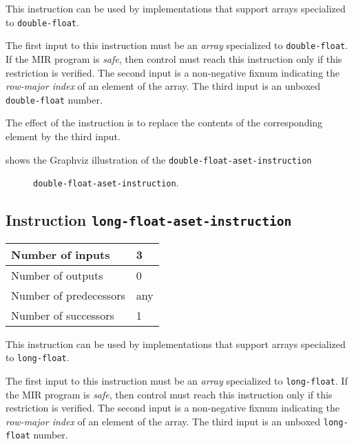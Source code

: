 This instruction can be used by implementations that support arrays
specialized to \texttt{double-float}.

The first input to this instruction must be an \emph{array}
specialized to \texttt{double-float}.  If the MIR program is
\emph{safe}, then control must reach this instruction only if this
restriction is verified.  The second input is a non-negative fixnum
indicating the \emph{row-major index} of an element of the array.  
The third input is an unboxed \texttt{double-float} number.

The effect of the instruction is to replace the contents of the
corresponding element by the third input.

 shows the Graphviz illustration of the
\texttt{double-float-aset-instruction}

\begin{figure}
\begin{center}
\end{center}
\caption{\label{fig-double-float-aset-instruction}
\texttt{double-float-aset-instruction}.}
\end{figure}

\subsection{Instruction \texttt{long-float-aset-instruction}}
\label{mir-instruction-long-float-aset}

\begin{tabular}{|l|l|}
\hline
Number of inputs & 3\\
\hline
Number of outputs & 0\\
\hline
Number of predecessors & any\\
\hline
Number of successors & 1\\
\hline
\end{tabular}

This instruction can be used by implementations that support arrays
specialized to \texttt{long-float}.

The first input to this instruction must be an \emph{array}
specialized to \texttt{long-float}.  If the MIR program is
\emph{safe}, then control must reach this instruction only if this
restriction is verified.  The second input is a non-negative fixnum
indicating the \emph{row-major index} of an element of the array.  
The third input is an unboxed \texttt{long-float} number.

